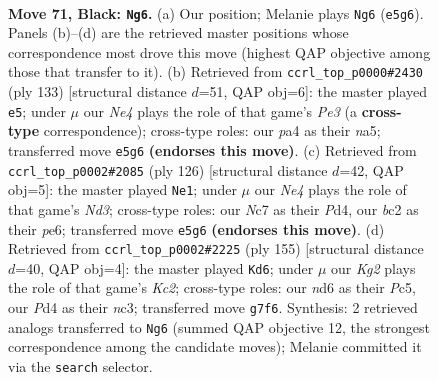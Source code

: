 \documentclass[11pt]{article}
\begin{document}
\clearpage

\begin{figure}[p]\centering
\begin{subfigure}{0.46\textwidth}\centering
\resizebox{\linewidth}{!}{%
\newchessgame
\chessboard[
  setfen={8/2n3k1/1b1N4/p3n3/P2pP3/1P5p/2B1P3/2K5 b - - 9 71},
  showmover=false,
  pgfstyle=straightmove, color=movearrow, markmove={e5-g6}
]}
\caption{}
\end{subfigure}\hfill
\begin{subfigure}{0.46\textwidth}\centering
\resizebox{\linewidth}{!}{%
\newchessgame
\chessboard[
  setfen={2b5/3n4/3kp3/NPp3p1/2P3P1/4K3/4B3/8 b - - 5 67},
  showmover=false,
  pgfstyle=straightmove, color=movearrow, markmove={e6-e5}
]}
\caption{}
\end{subfigure}
\\[4pt]
\begin{subfigure}{0.46\textwidth}\centering
\resizebox{\linewidth}{!}{%
\newchessgame
\chessboard[
  setfen={8/2b2k2/1pp1p3/8/1PnPP3/2BN4/4K3/8 w - - 0 64},
  showmover=false,
  pgfstyle=straightmove, color=movearrow, markmove={d3-e1}
]}
\caption{}
\end{subfigure}\hfill
\begin{subfigure}{0.46\textwidth}\centering
\resizebox{\linewidth}{!}{%
\newchessgame
\chessboard[
  setfen={8/2kn2p1/4b1Pp/1Pp4P/5K2/2N5/4B3/8 b - - 4 78},
  showmover=false,
  pgfstyle=straightmove, color=movearrow, markmove={c7-d6}
]}
\caption{}
\end{subfigure}
\caption{\textbf{Move 71, Black: \texttt{Ng6}.} (a) Our position; Melanie plays \texttt{Ng6} (\texttt{e5g6}). Panels (b)--(d) are the retrieved master positions whose correspondence most drove this move (highest QAP objective among those that transfer to it). (b) Retrieved from \texttt{ccrl\_top\_p0000\#2430} (ply 133) [structural distance $d$=51, QAP obj=6]: the master played \texttt{e5}; under $\mu$ our \emph{Ne4} plays the role of that game's \emph{Pe3} (a \textbf{cross-type} correspondence); cross-type roles: our \emph{p}a4 as their \emph{n}a5; transferred move \texttt{e5g6} \textbf{(endorses this move)}. (c) Retrieved from \texttt{ccrl\_top\_p0002\#2085} (ply 126) [structural distance $d$=42, QAP obj=5]: the master played \texttt{Ne1}; under $\mu$ our \emph{Ne4} plays the role of that game's \emph{Nd3}; cross-type roles: our \emph{N}c7 as their \emph{P}d4, our \emph{b}c2 as their \emph{p}e6; transferred move \texttt{e5g6} \textbf{(endorses this move)}. (d) Retrieved from \texttt{ccrl\_top\_p0002\#2225} (ply 155) [structural distance $d$=40, QAP obj=4]: the master played \texttt{Kd6}; under $\mu$ our \emph{Kg2} plays the role of that game's \emph{Kc2}; cross-type roles: our \emph{n}d6 as their \emph{P}c5, our \emph{P}d4 as their \emph{n}c3; transferred move \texttt{g7f6}. Synthesis: 2 retrieved analogs transferred to \texttt{Ng6} (summed QAP objective 12, the strongest correspondence among the candidate moves); Melanie committed it via the \texttt{search} selector.}
\label{fig:thought-m141}
\end{figure}
\end{document}
